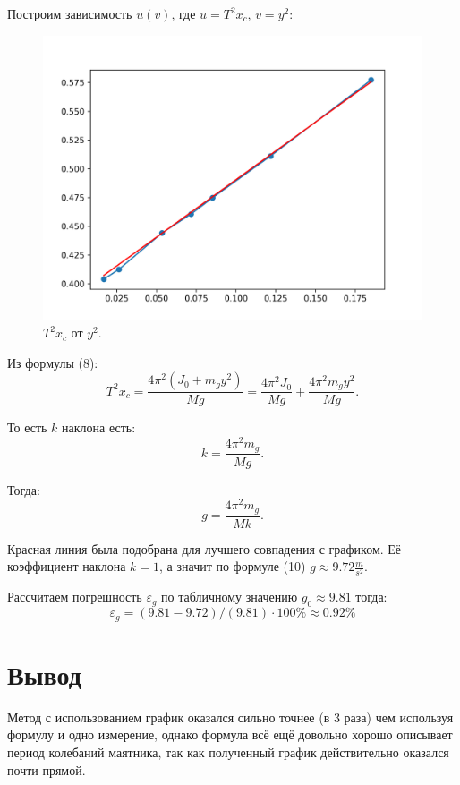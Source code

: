 \documentclass[12pt, a4paper]{article}
\begin{document}
Построим зависимость $u(v)$, где $u = T^2x_c$,  $v = y^2$:

\newpage

\begin{figure}[h]
    \includegraphics[width = 1\textwidth]{graph.png}
    \caption{$T^2x_c$ от $y^2$.}
\end{figure}

Из формулы (8):
\begin{equation}
    T^2x_c = \frac{4\pi^2(J_0 + m_gy^2)}{Mg} =
    \frac{4\pi^2J_0}{Mg} + \frac{4\pi^2m_gy^2}{Mg}.
\end{equation}

То есть $k$ наклона есть:
\[k = \frac{4\pi^2m_g}{Mg}.\]

Тогда:
\begin{equation}
    g = \frac{4\pi^2m_g}{Mk}.
\end{equation}

Красная линия была подобрана для лучшего совпадения с графиком. Её коэффициент
наклона $k = 1$, а значит по формуле (10) $g \approx 9.72 \frac{m}{s^2}$.

Рассчитаем погрешность $\varepsilon_g$ по табличному значению
$g_0 \approx 9.81$
тогда:
\[\varepsilon_g = (9.81 - 9.72) / (9.81) \cdot 100 \% \approx 0.92\%\]

\section{Вывод}

Метод с использованием график оказался сильно точнее (в 3 раза) чем
используя формулу и одно измерение, однако формула всё ещё довольно
хорошо описывает период колебаний маятника, так как полученный график
действительно оказался почти прямой.
\end{document}
